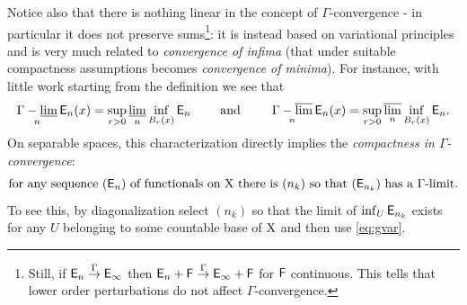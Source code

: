 \documentclass[11pt]{article}
\numberwithin{equation}{section}
\newcommand{\R}{\mathbb{R}}
\newcommand{\X}{{\rm X}}
\newcommand{\lims}{\varlimsup}
\newcommand{\limi}{\varliminf}
\newcommand{\E}{{\sf E}} %
\DeclareMathOperator*{\glimi}{{\Gamma-\limi}}
\DeclareMathOperator*{\glims}{\Gamma-\lims}
\begin{document}
Notice also that there is nothing linear in the concept of $\Gamma$-convergence - in particular it does not preserve sums\footnote{Still, if $\E_n\stackrel\Gamma\to\E_\infty$ then  $\E_n+{\sf F}\stackrel\Gamma\to\E_\infty+{\sf F}$ for ${\sf F}$  continuous. This tells that lower order perturbations do not affect $\Gamma$-convergence.}:
it is instead based on variational principles and is very much related 
to \emph{convergence of infima} (that under suitable compactness assumptions becomes \emph{convergence of minima}). For instance, with little work starting from the definition we see that
\begin{equation}
\label{eq:gvar}
\glimi_n\E_n(x)=\sup_{r>0}\limi_n\inf_{B_r(x)}\E_n\qquad\text{ and }\qquad \glims_n\E_n(x)=\sup_{r>0}\lims_n\inf_{B_r(x)}\E_n.
\end{equation}
On separable spaces, this characterization directly implies the \emph{compactness in $\Gamma$-convergence}:
\begin{equation}
\label{eq:compgamma}
\text{for any sequence $(\E_n)$ of functionals on $\X$ there is $(n_k)$ so that $(\E_{n_k})$ has a $\Gamma$-limit}.
\end{equation}
To see this, by diagonalization  select $(n_k)$ so that the limit of $\inf_U\E_{n_k}$ exists for any $U$ belonging to some countable base of $\X$ and then use \eqref{eq:gvar}.
\end{document}
